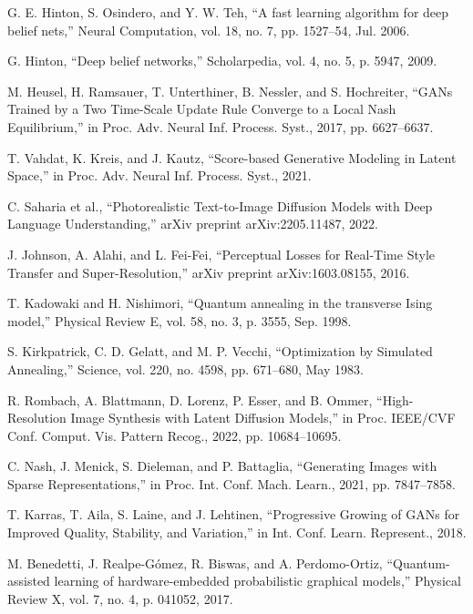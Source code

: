 \documentclass[10pt,twocolumn,letterpaper]{article}
\begin{document}
{\begin{thebibliography}{00}
 G. E. Hinton, S. Osindero, and Y. W. Teh, ``A fast learning algorithm for deep belief nets,'' Neural Computation, vol. 18, no. 7, pp. 1527–54, Jul. 2006.

 G. Hinton, ``Deep belief networks,'' Scholarpedia, vol. 4, no. 5, p. 5947, 2009.

 M. Heusel, H. Ramsauer, T. Unterthiner, B. Nessler, and S. Hochreiter, ``GANs Trained by a Two Time-Scale Update Rule Converge to a Local Nash Equilibrium,'' in Proc. Adv. Neural Inf. Process. Syst., 2017, pp. 6627–6637.

 T. Vahdat, K. Kreis, and J. Kautz, ``Score-based Generative Modeling in Latent Space,'' in Proc. Adv. Neural Inf. Process. Syst., 2021.

 C. Saharia et al., ``Photorealistic Text-to-Image Diffusion Models with Deep Language Understanding,'' arXiv preprint arXiv:2205.11487, 2022.

 J. Johnson, A. Alahi, and L. Fei-Fei, ``Perceptual Losses for Real-Time Style Transfer and Super-Resolution,'' arXiv preprint arXiv:1603.08155, 2016.

 T. Kadowaki and H. Nishimori, ``Quantum annealing in the transverse Ising model,'' Physical Review E, vol. 58, no. 3, p. 3555, Sep. 1998.

 S. Kirkpatrick, C. D. Gelatt, and M. P. Vecchi, ``Optimization by Simulated Annealing,'' Science, vol. 220, no. 4598, pp. 671–680, May 1983.

 R. Rombach, A. Blattmann, D. Lorenz, P. Esser, and B. Ommer, ``High-Resolution Image Synthesis with Latent Diffusion Models,'' in Proc. IEEE/CVF Conf. Comput. Vis. Pattern Recog., 2022, pp. 10684–10695.

 C. Nash, J. Menick, S. Dieleman, and P. Battaglia, ``Generating Images with Sparse Representations,'' in Proc. Int. Conf. Mach. Learn., 2021, pp. 7847–7858.

 T. Karras, T. Aila, S. Laine, and J. Lehtinen, ``Progressive Growing of GANs for Improved Quality, Stability, and Variation,'' in Int. Conf. Learn. Represent., 2018.

 M. Benedetti, J. Realpe-Gómez, R. Biswas, and A. Perdomo-Ortiz, ``Quantum-assisted learning of hardware-embedded probabilistic graphical models,'' Physical Review X, vol. 7, no. 4, p. 041052, 2017.


\end{thebibliography}}
\end{document}
